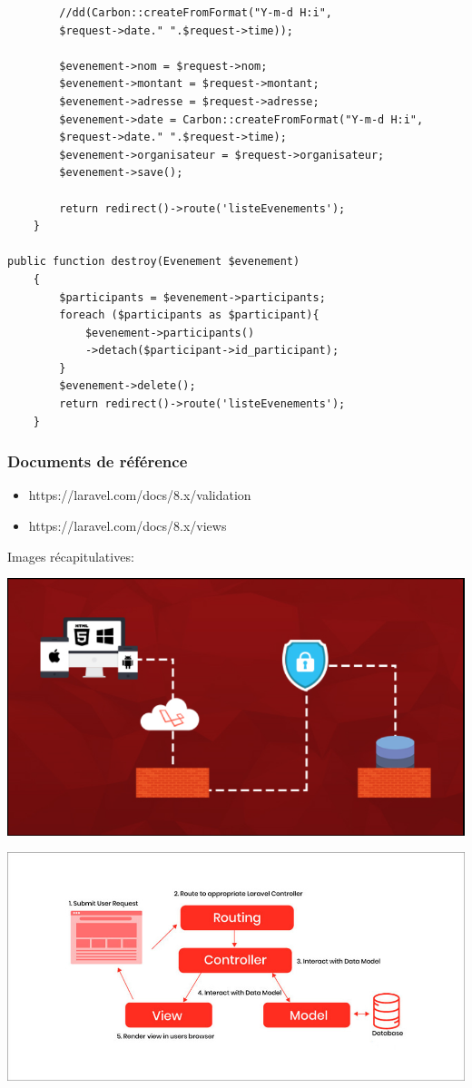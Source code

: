 \documentclass[12pt,a4paper]{article}
\begin{document}
\begin{verbatim}
        //dd(Carbon::createFromFormat("Y-m-d H:i", 
        $request->date." ".$request->time));

        $evenement->nom = $request->nom;
        $evenement->montant = $request->montant;
        $evenement->adresse = $request->adresse;
        $evenement->date = Carbon::createFromFormat("Y-m-d H:i", 
        $request->date." ".$request->time);
        $evenement->organisateur = $request->organisateur;
        $evenement->save();

        return redirect()->route('listeEvenements');
    }
    
public function destroy(Evenement $evenement)
    {
        $participants = $evenement->participants;
        foreach ($participants as $participant){
            $evenement->participants()
            ->detach($participant->id_participant);
        }
        $evenement->delete();
        return redirect()->route('listeEvenements');
    }
\end{verbatim}

\subsubsection{Documents de référence}
\begin{itemize}
\item https://laravel.com/docs/8.x/validation
\item https://laravel.com/docs/8.x/views
\end{itemize}

Images récapitulatives:
\begin{center}
\includegraphics[scale=0.5]{img/laravel.png}
\end{center}
\begin{center}
\includegraphics[scale=0.5]{img/MVC-Support.jpg}
\end{center}
\end{document}
